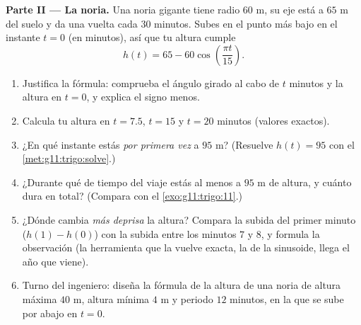 \begin{problem}
\medskip
\noindent\textbf{Parte II --- La noria.}
Una noria gigante tiene radio $60$ m, su eje está a $65$ m del suelo y da
una vuelta cada $30$ minutos. Subes en el punto más bajo en el instante
$t = 0$ (en minutos), así que tu altura cumple
\[
h(t) = 65 - 60 \cos\!\left(\frac{\pi t}{15}\right).
\]
\begin{enumerate}[resume]
  \item Justifica la fórmula: comprueba el ángulo girado al cabo de $t$
        minutos y la altura en $t = 0$, y explica el signo menos.
  \item Calcula tu altura en $t = 7.5$, $t = 15$ y $t = 20$ minutos
        (valores exactos).
  \item ¿En qué instante estás \emph{por primera vez} a $95$ m? (Resuelve
        $h(t) = 95$ con el \cref{met:g11:trigo:solve}.)
  \item ¿Durante qué  de tiempo del viaje estás al menos a $95$ m
        de altura, y cuánto dura en total? (Compara con el
        \cref{exo:g11:trigo:11}.)
  \item ¿Dónde cambia \emph{más deprisa} la altura? Compara la subida del
        primer minuto ($h(1) - h(0)$) con la subida entre los minutos $7$
        y $8$, y formula la observación (la herramienta que la vuelve
        exacta, la  de la sinusoide, llega el año que viene).
  \item Turno del ingeniero: diseña la fórmula de la altura de una noria
        de altura máxima $40$ m, altura mínima $4$ m y periodo $12$
        minutos, en la que se sube por abajo en $t = 0$.
\end{enumerate}


\end{problem}
